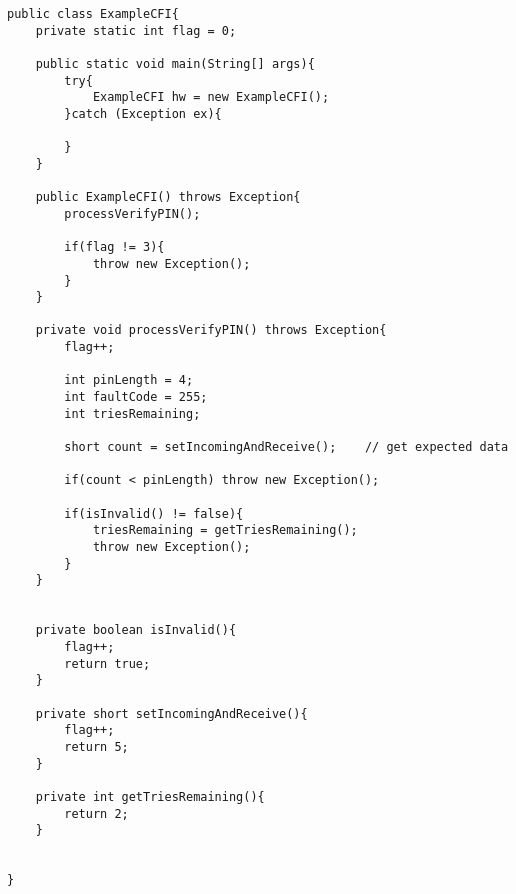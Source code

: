 \begin{lstlisting}[caption={Java code example of the control flow integrity countermeasure. Line 21 is removed in CFI2 in experiments},label={lst:examplecfi}]
public class ExampleCFI{
    private static int flag = 0;
	
    public static void main(String[] args){
        try{
            ExampleCFI hw = new ExampleCFI();
        }catch (Exception ex){

        }
    }

    public ExampleCFI() throws Exception{
        processVerifyPIN();
		
        if(flag != 3){
            throw new Exception();
        }
    }

    private void processVerifyPIN() throws Exception{
        flag++;
		
        int pinLength = 4;
        int faultCode = 255;
        int triesRemaining;

        short count = setIncomingAndReceive();    // get expected data
		
        if(count < pinLength) throw new Exception();

        if(isInvalid() != false){
            triesRemaining = getTriesRemaining();
            throw new Exception();
        }
    }


    private boolean isInvalid(){
        flag++;
        return true;
    }

    private short setIncomingAndReceive(){
        flag++;
        return 5;
    }

    private int getTriesRemaining(){
        return 2;
    }


}
\end{lstlisting}